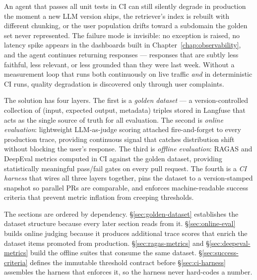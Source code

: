 


An agent that passes all unit tests in CI can still silently degrade in
production the moment a new LLM version ships, the retriever's index is
rebuilt with different chunking, or the user population drifts toward a
subdomain the golden set never represented.  The failure mode is invisible:
no exception is raised, no latency spike appears in the dashboards built in
Chapter~\ref{chap:observability}, and the agent continues returning
responses --- responses that are subtly less faithful, less relevant, or
less grounded than they were last week.  Without a measurement loop that
runs both continuously on live traffic \emph{and} in deterministic CI runs,
quality degradation is discovered only through user complaints.

The solution has four layers.  The first is a \emph{golden dataset} --- a
version-controlled collection of (input, expected output, metadata) triples
stored in Langfuse that acts as the single source of truth for all
evaluation.  The second is \emph{online evaluation}: lightweight
LLM-as-judge scoring attached fire-and-forget to every production trace,
providing continuous signal that catches distribution shift without blocking
the user's response.  The third is \emph{offline evaluation}: RAGAS and
DeepEval metrics computed in CI against the golden dataset, providing
statistically meaningful pass/fail gates on every pull request.  The fourth
is a \emph{CI harness} that wires all three layers together, pins the
dataset to a version-stamped snapshot so parallel PRs are comparable, and
enforces machine-readable success criteria that prevent metric inflation
from creeping thresholds.

The sections are ordered by dependency.  \S\ref{sec:golden-dataset}
establishes the dataset structure because every later section reads from it.
\S\ref{sec:online-eval} builds online judging because it produces additional
trace scores that enrich the dataset items promoted from production.
\S\ref{sec:ragas-metrics} and \S\ref{sec:deepeval-metrics} build the offline
suites that consume the same dataset.  \S\ref{sec:success-criteria} defines
the immutable threshold contract before \S\ref{sec:ci-harness} assembles the
harness that enforces it, so the harness never hard-codes a number.

